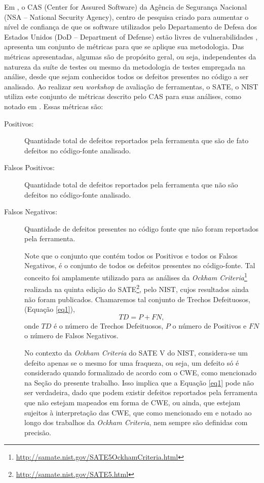 Em \cite{nsa}, o CAS (Center for Assured Software) da Agência de Segurança Nacional (NSA – National Security Agency), centro de pesquisa criado para aumentar o nível de confiança de que os software utilizados pelo Departamento de Defesa dos Estados Unidos (DoD – Department of Defense) estão livres de vulnerabilidades \cite{nsa}, apresenta um conjunto de métricas para que se aplique sua metodologia. Das métricas apresentadas, algumas são de propósito geral, ou seja, independentes da natureza da suíte de testes ou mesmo da metodologia de testes empregada na análise, desde que sejam conhecidos todos os defeitos presentes no código a ser analisado. Ao realizar seu \textit{workshop} de avaliação de ferramentas, o SATE, o NIST utiliza este conjunto de métricas descrito pelo CAS para suas análises, como notado em \cite{sate_iv}. Essas métricas são:
\begin{description}
    \item[Positivos:] Quantidade total de defeitos reportados pela ferramenta que são de fato defeitos no código-fonte analisado.

    \item[Falsos Positivos:] Quantidade total de defeitos reportados pela ferramenta que não são defeitos no código-fonte analisado.

    \item[Falsos Negativos:] Quantidade de defeitos presentes no código fonte que não foram reportados pela ferramenta.

      Note que o conjunto que contém todos os Positivos e todos os Falsos Negativos, é o conjunto de todos os defeitos presentes no código-fonte. Tal conceito foi amplamente utilizado para as análises da \textit{Ockham Criteria}\footnote{\url{http://samate.nist.gov/SATE5OckhamCriteria.html}} realizada na quinta edição do SATE\footnote{\url{http://samate.nist.gov/SATE5.html}}, pelo NIST, cujos resultados ainda não foram publicados. Chamaremos tal conjunto de Trechos Defeituosos, (Equação \eqref{eq1}),
\begin{equation}\label{eq1}
TD = P + FN,
\end{equation}
  onde $TD$ é o número de Trechos Defeituosos, $P$ o número de Positivos e $FN$ o número de Falsos Negativos.

  No contexto da \textit{Ockham Criteria} do SATE V do NIST, considera-se um defeito apenas se o mesmo for uma fraqueza, ou seja, um defeito só é considerado quando formalizado de acordo com o CWE, como mencionado   na Seção  do presente trabalho. Isso implica que a Equação \eqref{eq1} pode não ser verdadeira, dado que podem existir defeitos reportados pela ferramenta que não estejam mapeados em forma de CWE, ou ainda, que estejam sujeitos à interpretação das CWE, que como mencionado em \cite{yan} e notado ao longo dos trabalhos  da \textit{Ockham Criteria}, nem sempre são definidas com precisão.


\end{description}
